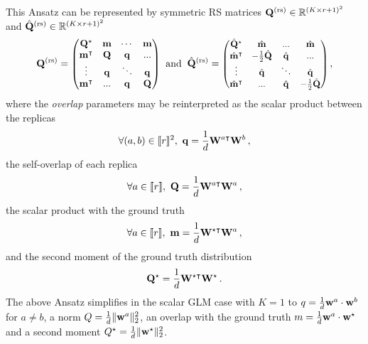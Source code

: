 			This Ansatz can be represented by symmetric RS matrices ${\mathbf{Q}}^{(\mathrm{rs})} \in \mathbb{R}^{(K \times r+1)^2}$ and $\hat{{\mathbf{Q}}}^{(\mathrm{rs})} \in \mathbb{R}^{(K \times r+1)^2}$
			\begin{equation}
			\begin{aligned}[c]
			\mat{Q}^{(\rs)} = \scalemath{0.95}{\begin{pmatrix} 
			\mat{Q}^\star & \mat{m} & \cdots & \mat{m} \\
			\mat{m}^\intercal  & \mat{Q}  & \mat{q} & ...  \\
			\vdots & \mat{q} & \ddots & \mat{q}   \\
			\mat{m}^\intercal  &... & \mat{q}  & \mat{Q}     \\
			\end{pmatrix}}
			\end{aligned}
			\hspace{0.2cm}
			\textrm{and} 
			\hspace{0.2cm}
			\begin{aligned}[c]
			\hat{\mat{Q}}^{(\rs)}=\scalemath{0.9}{\begin{pmatrix} 
			 \hat{\mat{Q}}^\star & \hat{\mat{m}} & ... & \hat{\mat{m}}\\
			\hat{\mat{m}}^\intercal &-\frac{1}{2}\hat{\mat{Q}} & \hat{\mat{q}} & ...  \\
			 \vdots & \hat{\mat{q}} & \ddots & \hat{\mat{q}}  \\
			\hat{\mat{m}}^\intercal &... & \hat{\mat{q}} & -\frac{1}{2}\hat{\mat{Q}}\\  
			\end{pmatrix}}\,,
			\end{aligned}
			\end{equation}
			where the \emph{overlap} parameters may be reinterpreted as the scalar product between the replicas
			\begin{align*}
				\forall (a,b) \in \llbracket r \rrbracket^2,~ {\mathbf{q}} = \frac{1}{d} {\mathbf{W}}^{a \intercal} {\mathbf{W}}^{b}\,,
			\end{align*}
			the self-overlap of each replica
			\begin{align*}
				\forall a \in \llbracket r \rrbracket,~ {\mathbf{Q}} = \frac{1}{d} {\mathbf{W}}^{a \intercal} {\mathbf{W}}^{a}\,,
			\end{align*}
			the scalar product with the ground truth
			\begin{align*}
				\forall a \in \llbracket r \rrbracket,~ {\mathbf{m}} = \frac{1}{d} {\mathbf{W}}^{\star \intercal} {\mathbf{W}}^{a}\,,
			\end{align*}
			and the second moment of the ground truth distribution
			\begin{align*}
				{\mathbf{Q}}^\star = \frac{1}{d} {\mathbf{W}}^{\star \intercal} {\mathbf{W}}^{\star}\,.
			\end{align*}
			The above Ansatz simplifies in the scalar GLM case with $K=1$ to
			$q = \frac{1}{d} {\mathbf{w}}^a \cdot {\mathbf{w}}^b$ for $a \ne b$, a norm $Q= \frac{1}{d} \|{\mathbf{w}}^a\|_2^2$, an overlap with the ground truth $m =\frac{1}{d} {\mathbf{w}}^a \cdot {\mathbf{w}}^\star$ and a second moment $Q^\star= \frac{1}{d} \|{\mathbf{w}}^\star\|_2^2$.\\
		
